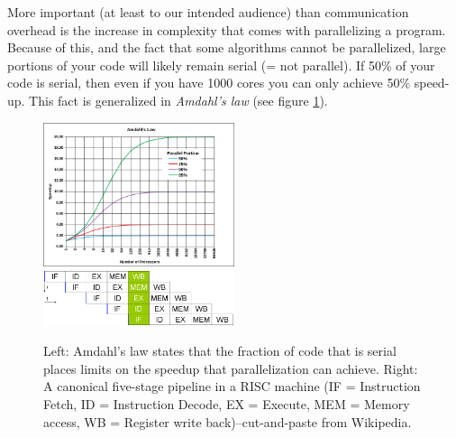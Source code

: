 More important (at least to our intended audience) than communication overhead is the increase in complexity that comes with parallelizing a program.  Because of this, and the fact that some algorithms cannot be parallelized, large portions of your code will likely remain serial (= not parallel).  If 50\% of your code is serial, then even if you have 1000 cores you can only achieve 50\% speed-up.  This fact is generalized in \emph{Amdahl's law} (see figure \ref{performance:fig:amdahl}).
\begin{figure}
  \includegraphics[width=0.5\textwidth]{../images/AmdahlsLaw}
  \includegraphics[width=0.5\textwidth]{../images/800px-Fivestagespipeline}
  \label{performance:fig:amdahl}
  \caption{Left:  Amdahl's law states that the fraction of code that is serial places limits on the speedup that parallelization can achieve.  Right: A canonical five-stage pipeline in a RISC machine (IF = Instruction Fetch, ID = Instruction Decode, EX = Execute, MEM = Memory access, WB = Register write back)--cut-and-paste from Wikipedia.}
\end{figure}

